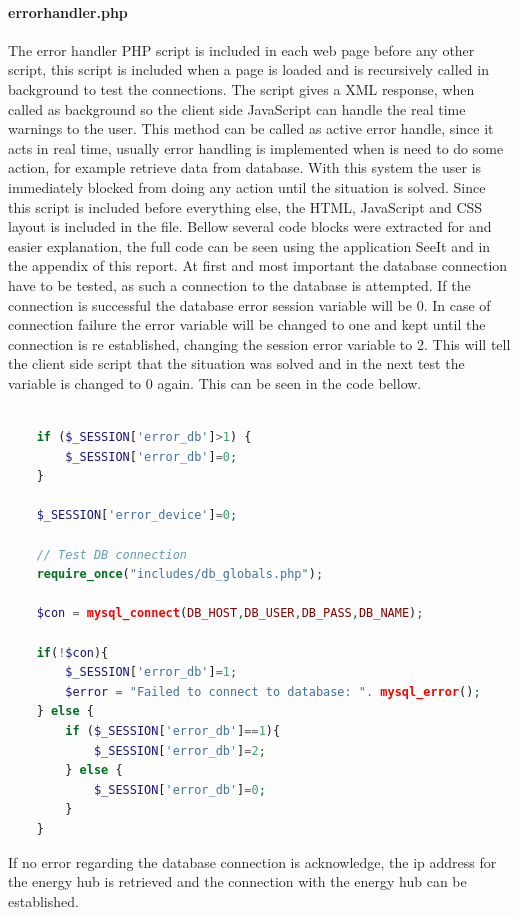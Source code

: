 \paragraph{errorhandler.php} The error handler PHP script is included in each web page before any other script, this script is included when a page is loaded and is recursively called in background to test the connections. The script gives a XML response, when called as background so the client side JavaScript can handle the real time warnings to the user. This method can be called as active error handle, since it acts in real time, usually error handling is implemented when is need to do some action, for example retrieve data from database. With this system the user is immediately blocked from doing any action until the situation is solved.
\p
Since this script is included before everything else, the HTML, JavaScript and CSS layout is included in the file. Bellow several code blocks were extracted for and easier explanation, the full code can be seen using the application SeeIt and in the appendix of this report.
\p
At first and most important the database connection have to be tested, as such a connection to the database is attempted. If the connection is successful the database error session variable will be 0. In case of connection failure the error variable will be changed to one and kept until the connection is re established, changing the session error variable to 2. This will tell the client side script that the situation was solved and in the next test the variable is changed to 0 again. This can be seen in the code bellow.
\begin{lstlisting}[language=php]
	
	if ($_SESSION['error_db']>1) { 
		$_SESSION['error_db']=0;
	}

	$_SESSION['error_device']=0;

	// Test DB connection
	require_once("includes/db_globals.php");
	
	$con = mysql_connect(DB_HOST,DB_USER,DB_PASS,DB_NAME);
	
	if(!$con){
		$_SESSION['error_db']=1;
		$error = "Failed to connect to database: ". mysql_error();
	} else {
		if ($_SESSION['error_db']==1){
			$_SESSION['error_db']=2;
		} else {
			$_SESSION['error_db']=0;	
		}
	}
\end{lstlisting}

If no error regarding the database connection is acknowledge, the ip address for the energy hub is retrieved and the connection with the energy hub can be established.

